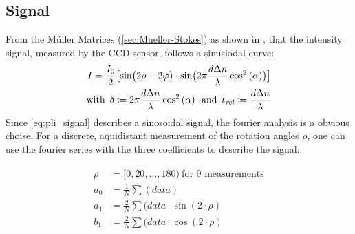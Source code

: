 \subsection{Signal}
% 
From the M\"{u}ller Matrices (\cref{sec:Mueller-Stokes}) as shown in \cite{MenzelMaster,MenzelDissertation}, that the intensity signal, measured by the \ac{CCD}-sensor, follows a sinusiodal curve:
% 
\begin{align}
\label{eq:pli_signal}
\begin{split}
I =\frac{I_0}{2}\bigl[ \sin\bigl(2\rho - 2\varphi \bigr)\cdot \sin \bigl( 2\pi\frac{d \textnormal{$\Delta n$}}{\lambda} \cos^2\left( \alpha \right) \bigr) \bigr] \\
\text{with} \enspace \delta \coloneqq 2\pi\frac{d \textnormal{$\Delta n$}}{\lambda} \cos^2\left( \alpha \right) \enspace 
\text{and} \enspace \textnormal{$t_\mathit{rel}$} \coloneqq \frac{d \textnormal{$\Delta n$}}{\lambda}
\end{split}
\end{align}
% 
Since \cref{eq:pli_signal} describes a sinosoidal signal, the fourier analysis is a obvious choise.
For a discrete, aquidistant measurement of the rotation angles $\rho$, one can use the fourier series with the three coefficients to describe the signal:
% 

\begin{align}
\begin{split}
\rho &= [0, 20, ..., 180) \> \text{for 9 measurements}\\
a_0 &= \frac{1}{N} \sum(\mathit{data})\\
a_1 &= \frac{2}{N} \sum(\mathit{data} \cdot \sin(2 \cdot \rho)\\
b_1 &= \frac{2}{N} \sum(\mathit{data} \cdot \cos(2 \cdot \rho)
\end{split}
\end{align}

